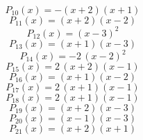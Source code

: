 \subitem \begin{dmath*}P_{10}(x) = -{\left(x + 2\right)} {\left(x + 1\right)} \end{dmath*}\vspace{-1.2cm}
\subitem \begin{dmath*}P_{11}(x) = {\left(x + 2\right)} {\left(x - 2\right)} \end{dmath*}\vspace{-1.2cm}
\subitem \begin{dmath*}P_{12}(x) = {\left(x - 3\right)}^{2} \end{dmath*}\vspace{-1.2cm}
\subitem \begin{dmath*}P_{13}(x) = {\left(x + 1\right)} {\left(x - 3\right)} \end{dmath*}\vspace{-1.2cm}
\subitem \begin{dmath*}P_{14}(x) = -2 \, {\left(x - 2\right)}^{2} \end{dmath*}\vspace{-1.2cm}
\subitem \begin{dmath*}P_{15}(x) = 2 \, {\left(x + 2\right)} {\left(x - 1\right)} \end{dmath*}\vspace{-1.2cm}
\subitem \begin{dmath*}P_{16}(x) = {\left(x + 1\right)} {\left(x - 2\right)} \end{dmath*}\vspace{-1.2cm}
\subitem \begin{dmath*}P_{17}(x) = 2 \, {\left(x + 1\right)} {\left(x - 1\right)} \end{dmath*}\vspace{-1.2cm}
\subitem \begin{dmath*}P_{18}(x) = 2 \, {\left(x + 1\right)} {\left(x - 1\right)} \end{dmath*}\vspace{-1.2cm}
\subitem \begin{dmath*}P_{19}(x) = {\left(x + 2\right)} {\left(x - 3\right)} \end{dmath*}\vspace{-1.2cm}
\subitem \begin{dmath*}P_{20}(x) = {\left(x - 1\right)} {\left(x - 3\right)} \end{dmath*}\vspace{-1.2cm}
\subitem \begin{dmath*}P_{21}(x) = {\left(x + 2\right)} {\left(x + 1\right)} \end{dmath*}\vspace{-1.2cm}
